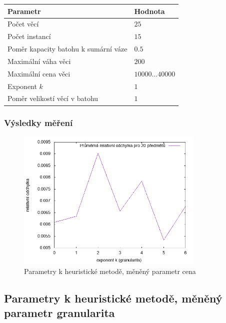 \documentclass{article}
\begin{document}
\begin{table}[H]
\centering
    \begin{tabular}{ |l|l| } 
        \hline
        Parametr & Hodnota \\
        \hline
        \hline
        Počet věcí & $25$ \\
        Počet instancí & $15$ \\
        Poměr kapacity batohu k sumární váze & $0.5$ \\
        Maximální váha věci & $200$ \\
        Maximální cena věci & $10000 \dots 40000$ \\
        Exponent $k$ & $1$ \\
        Poměr velikostí věcí v batohu & $1$ \\
        \hline
    \end{tabular}
\end{table}

\subsubsection*{Výsledky měření}

\begin{figure}[H]
    \centering
    \includegraphics[width=0.8\textwidth]{inputs-heuristic-granularity/inputs-heuristic-granularity.png}
    \caption{Parametry k heuristické metodě, měněný parametr cena}
    \label{fig:g4}
\end{figure}

\subsection{Parametry k heuristické metodě, měněný parametr granularita}
\end{document}
